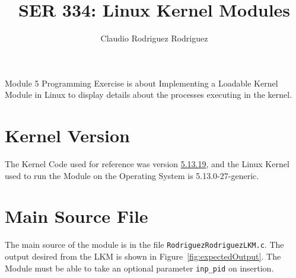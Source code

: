 \documentclass{article}
\begin{document}
\title{SER 334: Linux Kernel Modules}
\author{Claudio Rodriguez Rodriguez}
\maketitle







Module 5 Programming Exercise is about Implementing a Loadable Kernel Module in 
Linux to display details about the processes executing in the kernel. 

\section{Kernel Version}

The Kernel Code used for reference was version \href{https://git.kernel.org/pub/scm/linux/kernel/git/stable/linux.git/snapshot/linux-5.13.19.tar.gz.}{5.13.19}, 
and the Linux Kernel used to run the Module on the Operating System is 5.13.0-27-generic.

\section{Main Source File}

The main source of the module is in the file \texttt{RodriguezRodriguezLKM.c}.
The output desired from the LKM is shown in Figure~\ref{fig:expectedOutput}. 
The Module must be able to take an optional parameter \texttt{inp\_pid} on insertion.\\
\end{document}
